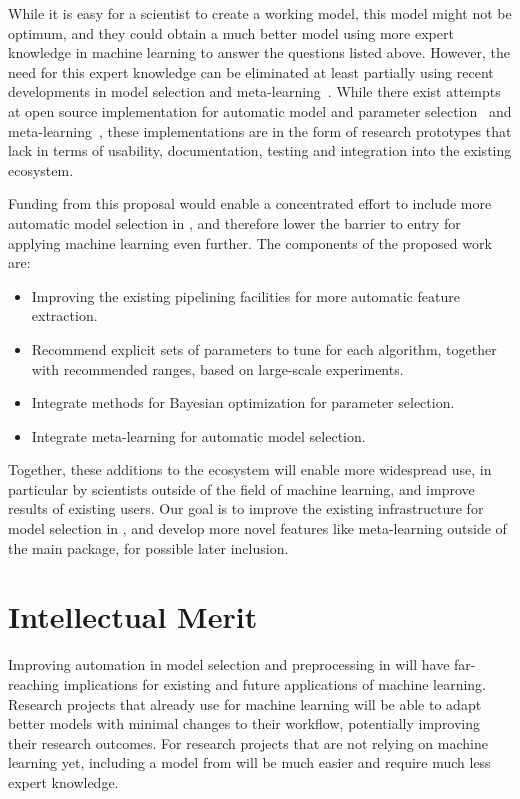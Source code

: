 While it is easy for a scientist to create a working model, this model might not
be optimum, and they could obtain a much better model using more expert knowledge
in machine learning to answer the questions listed above.
However, the need for this expert knowledge can be eliminated at least partially
using recent developments in model selection and
meta-learning~\autocite{NIPS2011_4443, feurer-nips2015,
snoek2015scalable, NIPS2012_4522}. While there exist attempts at
open source implementation for automatic model and parameter
selection~\autocite{bergstra2013hyperopt, komer2014hyperopt,
NIPS2012_4522, hutter2011sequential} and
meta-learning~\autocite{feurer-nips2015}, these implementations are
in the form of research prototypes that lack in terms of usability,
documentation, testing and integration into the existing
ecosystem.

Funding from this proposal would enable a concentrated effort to include more
automatic model selection in \sklearn{}, and therefore lower the barrier to
entry for applying machine learning even further.
The components of the proposed work are:
\begin{itemize}
    \item Improving the existing pipelining facilities for more automatic feature extraction.
    \item Recommend explicit sets of parameters to tune for each algorithm,
        together with recommended ranges, based on large-scale experiments.
    \item Integrate methods for Bayesian optimization for parameter selection.
    \item Integrate meta-learning for automatic model selection.
\end{itemize}
Together, these additions to the \sklearn{} ecosystem will enable more widespread use,
in particular by scientists outside of the field of machine learning, and improve results
of existing users.
Our goal is to improve the existing infrastructure for model selection in
\sklearn{}, and develop more novel features like meta-learning outside of the main
\sklearn{} package, for possible later inclusion.

\section{Intellectual Merit}
Improving automation in model selection and preprocessing in \sklearn{} will have far-reaching
implications for existing and future applications of machine learning.
Research projects that already use \sklearn{} for machine learning will be able to adapt better
models with minimal changes to their workflow, potentially improving their research outcomes.
For research projects that are not relying on machine learning yet, including a model
from \sklearn{} will be much easier and require much less expert knowledge.

